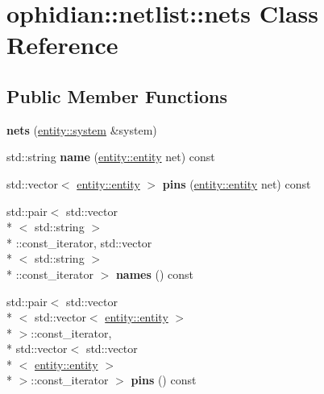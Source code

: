 \hypertarget{classophidian_1_1netlist_1_1nets}{\section{ophidian\-:\-:netlist\-:\-:nets Class Reference}
\label{classophidian_1_1netlist_1_1nets}
}
\subsection*{Public Member Functions}
\begin{DoxyCompactItemize}
\item 
\hypertarget{classophidian_1_1netlist_1_1nets_aa351bf8c8019a6531f45b214def8fa74}{{\bfseries nets} (\hyperlink{classophidian_1_1entity_1_1system}{entity\-::system} \&system)}\label{classophidian_1_1netlist_1_1nets_aa351bf8c8019a6531f45b214def8fa74}

\item 
\hypertarget{classophidian_1_1netlist_1_1nets_a56ac53bbd743101fc7dfaae9299fa831}{std\-::string {\bfseries name} (\hyperlink{classophidian_1_1entity_1_1entity}{entity\-::entity} net) const }\label{classophidian_1_1netlist_1_1nets_a56ac53bbd743101fc7dfaae9299fa831}

\item 
\hypertarget{classophidian_1_1netlist_1_1nets_a36be79709421f579420034aea356247d}{std\-::vector$<$ \hyperlink{classophidian_1_1entity_1_1entity}{entity\-::entity} $>$ {\bfseries pins} (\hyperlink{classophidian_1_1entity_1_1entity}{entity\-::entity} net) const }\label{classophidian_1_1netlist_1_1nets_a36be79709421f579420034aea356247d}

\item 
\hypertarget{classophidian_1_1netlist_1_1nets_ae9cfc72e8f37515d27f76ba3f213bc15}{std\-::pair$<$ std\-::vector\\*
$<$ std\-::string $>$\\*
\-::const\-\_\-iterator, std\-::vector\\*
$<$ std\-::string $>$\\*
\-::const\-\_\-iterator $>$ {\bfseries names} () const }\label{classophidian_1_1netlist_1_1nets_ae9cfc72e8f37515d27f76ba3f213bc15}

\item 
\hypertarget{classophidian_1_1netlist_1_1nets_a57d8a47cf106a56430e1a63d71ff0ab4}{std\-::pair$<$ std\-::vector\\*
$<$ std\-::vector$<$ \hyperlink{classophidian_1_1entity_1_1entity}{entity\-::entity} $>$\\*
 $>$\-::const\-\_\-iterator, \\*
std\-::vector$<$ std\-::vector\\*
$<$ \hyperlink{classophidian_1_1entity_1_1entity}{entity\-::entity} $>$\\*
 $>$\-::const\-\_\-iterator $>$ {\bfseries pins} () const }\label{classophidian_1_1netlist_1_1nets_a57d8a47cf106a56430e1a63d71ff0ab4}


\end{DoxyCompactItemize}
